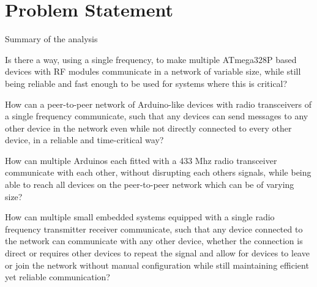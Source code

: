 \section{Problem Statement}\label{sec:problemStatement}

Summary of the analysis

\bigskip

{\addtolength{\leftskip}{10mm}\addtolength{\rightskip}{10mm}\noindent\hrulefill\it

\noindent Is there a way, using a single frequency, to make multiple ATmega328P based devices with RF modules communicate in a network of variable size, while still being reliable and fast enough to be used for systems where this is critical? %


\noindent\hrulefill

\noindent How can a peer-to-peer network of Arduino-like devices with radio transceivers of a single frequency communicate, such that any devices can send messages to any other device in the network even while not directly connected to every other device, in a reliable and time-critical way? 

\noindent\hrulefill

\noindent How can multiple Arduinos each fitted with a 433 Mhz radio transceiver communicate with each other, without disrupting each others signals, while being able to reach all devices on the peer-to-peer network which can be of varying size? %

\noindent\hrulefill

\noindent How can multiple small embedded systems equipped with a single radio frequency transmitter receiver communicate, such that any device connected to the network can communicate with any other device, whether the connection is direct or requires other devices to repeat the signal and allow for devices to leave or join the network without manual configuration while still maintaining efficient yet reliable communication? %

\noindent\hrulefill

}

\bigskip









